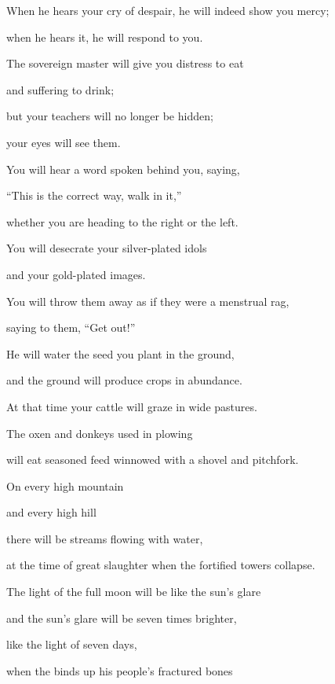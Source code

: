 {\par }{\Q When he hears your cry
of despair,
he will indeed show
you mercy;
\par }{\Q when
he hears
it, he will respond to you.
\par }{\Q {}The sovereign
master will give
you distress
to eat
\par }{\Q and suffering to drink;
\par }{\Q but your teachers
will no
longer
be
hidden;
\par }{\Q your eyes
will see them.
\par }{\Q {}You will hear
a word
spoken behind
you, saying,
\par }{\Q “This
is the correct way,
walk in
it,”
\par }{\Q whether you are heading to the right
or the left.
\par }{\Q {}You will desecrate
your silver-plated
idols
\par }{\Q and your gold-plated
images.
\par }{\Q You will throw them away as
if they were a menstrual rag,
\par }{\Q saying
to them, “Get out!”
\par }{\Q {}He will water
the seed
you plant
in the ground,
\par }{\Q and the ground
will
produce crops
in abundance.
\par }{\Q At that time
your cattle
will graze
in wide
pastures.
\par }{\Q {}The oxen
and donkeys
used in plowing
\par }{\Q will eat
seasoned
feed
winnowed
with
a shovel
and pitchfork.
\par }{\Q {}On
every
high
mountain
\par }{\Q and every
high
hill
\par }{\Q there will be streams
flowing
with water,
\par }{\Q at the time
of great
slaughter
when
the fortified towers
collapse.
\par }{\Q {}The light
of the full moon
will be
like the sun’s
glare
\par }{\Q and the sun’s
glare
will be
seven times
brighter,
\par }{\Q like the light
of seven
days,
\par }{\Q when
the {}
binds up
his people’s
fractured
bones

}

